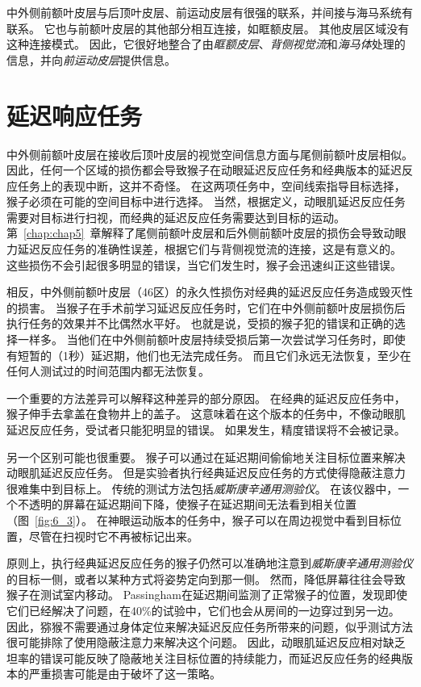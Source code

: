 中外侧前额叶皮层与后顶叶皮层、前运动皮层有很强的联系，并间接与海马系统有联系。
它也与前额叶皮层的其他部分相互连接，如眶额皮层。
其他皮层区域没有这种连接模式。
因此，它很好地整合了由\textit{眶额皮层}、\textit{背侧视觉流}和\textit{海马体}处理的信息，并向\textit{前运动皮层}提供信息。



\section{延迟响应任务}

中外侧前额叶皮层在接收后顶叶皮层的视觉空间信息方面与尾侧前额叶皮层相似。
因此，任何一个区域的损伤都会导致猴子在动眼延迟反应任务和经典版本的延迟反应任务上的表现中断，这并不奇怪。
在这两项任务中，空间线索指导目标选择，猴子必须在可能的空间目标中进行选择。
当然，根据定义，动眼肌延迟反应任务需要对目标进行扫视，而经典的延迟反应任务需要达到目标的运动。
第~\ref{chap:chap5}~章解释了尾侧前额叶皮层和后外侧前额叶皮层的损伤会导致动眼力延迟反应任务的准确性误差，根据它们与背侧视觉流的连接，这是有意义的。
这些损伤不会引起很多明显的错误，当它们发生时，猴子会迅速纠正这些错误\cite{tsujimoto2012prefrontal}。


相反，中外侧前额叶皮层（46区）的永久性损伤对经典的延迟反应任务造成毁灭性的损害。
当猴子在手术前学习延迟反应任务时，它们在中外侧前额叶皮层损伤后执行任务的效果并不比偶然水平好\cite{goldman1978prenatal}。
也就是说，受损的猴子犯的错误和正确的选择一样多。
当他们在中外侧前额叶皮层持续受损后第一次尝试学习任务时，即使有短暂的（1秒）延迟期，他们也无法完成任务\cite{battig1960comparison}。
而且它们永远无法恢复，至少在任何人测试过的时间范围内都无法恢复。


一个重要的方法差异可以解释这种差异的部分原因。
在经典的延迟反应任务中，猴子伸手去拿盖在食物井上的盖子。
这意味着在这个版本的任务中，不像动眼肌延迟反应任务，受试者只能犯明显的错误。
如果发生，精度错误将不会被记录。


另一个区别可能也很重要。
猴子可以通过在延迟期间偷偷地关注目标位置来解决动眼肌延迟反应任务。
但是实验者执行经典延迟反应任务的方式使得隐蔽注意力很难集中到目标上。
传统的测试方法包括\textit{威斯康辛通用测验仪}。
在该仪器中，一个不透明的屏幕在延迟期间下降，使猴子在延迟期间无法看到相关位置（图~\ref{fig:6_3}）。
在神眼运动版本的任务中，猴子可以在周边视觉中看到目标位置，尽管在扫视时它不再被标记出来。


原则上，执行经典延迟反应任务的猴子仍然可以准确地注意到\textit{威斯康辛通用测验仪}的目标一侧，或者以某种方式将姿势定向到那一侧。
然而，降低屏幕往往会导致猴子在测试室内移动。
Passingham\cite{passingham1971behavioural}在延迟期间监测了正常猴子的位置，发现即使它们已经解决了问题，在40\%的试验中，它们也会从房间的一边穿过到另一边。
因此，猕猴不需要通过身体定位来解决延迟反应任务所带来的问题，似乎测试方法很可能排除了使用隐蔽注意力来解决这个问题。
因此，动眼肌延迟反应相对缺乏坦率的错误可能反映了隐蔽地关注目标位置的持续能力，而延迟反应任务的经典版本的严重损害可能是由于破坏了这一策略。



